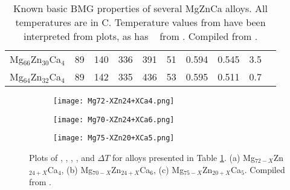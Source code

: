 \documentclass[draft,a4paper,12pt,oneside]{report}%
\begin{document}
\begin{table}[h]
\begin{tabular}{ l l l l l l l l l l }
		Mg$_{66}$Zn$_{30}$Ca$_{4}$ & 89 & 140 & 336 & 391 & 51 & 0.594 & 0.545 & 3.5 & \cite{Cao2013, Cao2012} \\ 
		Mg$_{64}$Zn$_{32}$Ca$_{4}$ & 89 & 142 & 335 & 436 & 53 & 0.595 & 0.511 & 0.7 & \cite{Cao2013, Cao2012} \\
		\bottomrule 
	\end{tabular}
	\caption[MgZnCa BMG System Properties]{Known basic BMG properties of several MgZnCa alloys. All temperatures are in \degree C. Temperature values from \cite{Gu2005} have been interpreted from plots, as has \Tg~ from \cite{Wang2013}. Compiled from \cite{Cao2013, Gu2005, Zhou2013, Cao2012, Wang2013}.}
	\label{tab:MgZnCaAlloys}
\end{table}

\begin{figure}[bp]
	\centering
	\begin{subfigure}[htbp]{0.49\textwidth}
		\texttt{[image: Mg72-XZn24+XCa4.png]}
		\caption{}
		\label{fig:Mg72xZn24xCa4}
	\end{subfigure}
	\begin{subfigure}[htbp]{0.49\textwidth}
		\texttt{[image: Mg70-XZn24+XCa6.png]}
		\caption{}
		\label{fig:Mg70xZn24xCa6}
	\end{subfigure}
	\begin{subfigure}[htbp]{0.49\textwidth}
		\texttt{[image: Mg75-XZn20+XCa5.png]}
		\caption{}
		\label{fig:Mg75xZn20xCa5}
	\end{subfigure}
	\caption[MgZnCa BMG System Properties Plots]{Plots of \Tg, \Tx, \Tm, \Tl, and $\Delta T$ for alloys presented in Table \ref{tab:MgZnCaAlloys}. (a) Mg$_{72-X}$Zn$_{24+X}$Ca$_{4}$, (b) Mg$_{70-X}$Zn$_{24+X}$Ca$_{6}$, (c) Mg$_{75-X}$Zn$_{20+X}$Ca$_{5}$. Compiled from \cite{Cao2013, Gu2005, Zhou2013, Cao2012, Wang2013}.}%
	\label{fig:MgZnCaPlots}
\end{figure}
    
\end{document}
